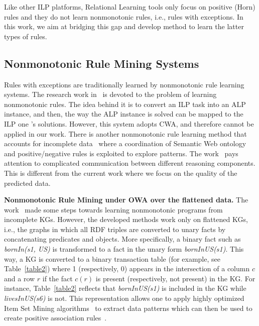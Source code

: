 Like other ILP platforms, Relational Learning tools only focus on positive (Horn) rules and they do not learn nonmonotonic rules, i.e., rules with exceptions. In this work, we aim at bridging this gap and develop method to learn the latter types of rules.

\subsection{Nonmonotonic Rule Mining Systems}
\label{related-work-nonmonotonic-rule-mining-systems}

Rules with exceptions are traditionally learned by nonmonotonic rule learning systems. The research work in~\cite{ref32} is devoted to the problem of learning nonmonotonic rules. The idea behind it is to convert an ILP task into an ALP~\cite{ref31} instance, and then, the way the ALP instance is solved can be mapped to the ILP one 's solutions. However, this system adopts CWA, and therefore cannot be applied in our work. There is another nonmonotonic rule learning method that accounts for incomplete data~\cite{ref34} where a coordination of Semantic Web ontology and positive/negative rules is exploited to explore patterns. The work~\cite{ref34} pays attention to complicated communication between different reasoning components. This is different from the current work where we focus on the quality of the predicted data.

\textbf{Nonmonotonic Rule Mining under OWA over the flattened data.} The work~\cite{ref12} made some steps towards learning nonmonotonic programs from incomplete KGs. However, the developed methods work only on flattened KGs, i.e., the graphs in which all RDF triples are converted to unary facts by concatenating predicates and objects. More specifically, a binary fact such as \textit{bornIn(s1, US)} is transformed to a fact in the unary form \textit{bornInUS(s1)}. This way, a KG is converted to a binary transaction table (for example, see Table~\ref{table2}) where 1 (respectively, 0) appears in the intersection of a column $c$ and a row $r$ if the fact $c(r)$ is present (respectively, not present) in the KG. For instance, Table~\ref{table2} reflects that \textit{bornInUS(s1)} is included in the KG while \textit{livesInUS(s6)} is not. This representation allows one to apply highly optimized Item Set Mining algorithms~\cite{ref37} to extract data patterns which can then be used to create positive association rules~\cite{ref13}.

